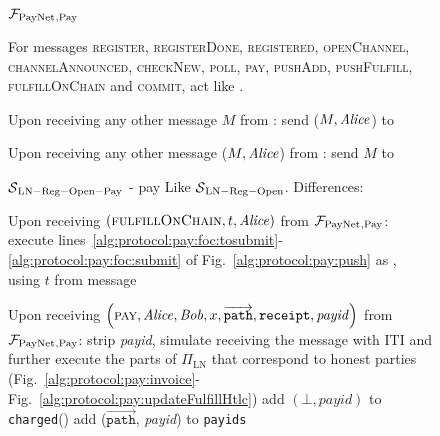 \begin{figure}[H]
  \begin{systembox}{$\mathcal{F}_{\mathrm{PayNet}}{}_{\mathrm{, Pay}}$}
    \begin{algorithmic}[1]
      \State For messages \textsc{register}, \textsc{registerDone},
      \textsc{registered}, \textsc{openChannel}, \textsc{channelAnnounced},
      \textsc{checkNew}, \textsc{poll}, \textsc{pay}, \textsc{pushAdd},
      \textsc{pushFulfill}, \textsc{fulfillOnChain} and \textsc{commit}, act
      like \fpaynet{}.
      \Statex

      \State Upon receiving any other message $M$ from \alice:
      \Indent
          \State send ($M, \mathit{Alice}$) to \simulator
        \EndIf
      \EndIndent
      \Statex

      \State Upon receiving any other message ($M, \mathit{Alice}$) from \simulator:
      \Indent
          \State send $M$ to \alice
        \EndIf
      \EndIndent
    \end{algorithmic}
  \end{systembox}
  \caption{}
  \label{alg:proof:fpaynet:pay}
\end{figure}

\begin{figure}[H]
  \begin{simulatorbox}{$\mathcal{S}{}_{\mathrm{LN - Reg - Open - Pay}}$ - pay}
    Like $\mathcal{S}{}_{\mathrm{LN - Reg - Open}}$. Differences:
    \begin{algorithmic}[1]
      \State Upon receiving $\left(\textsc{fulfillOnChain}, t, \mathit{Alice}\right)$
      from $\mathcal{F}_{\mathrm{PayNet}}{}_{\mathrm{, Pay}}$:
      \Indent
        \State execute
        lines~\ref{alg:protocol:pay:foc:tosubmit}-\ref{alg:protocol:pay:foc:submit}
        of Fig.~\ref{alg:protocol:pay:push} as \alice{}, using $t$ from message
      \EndIndent
      \Statex

      \State Upon receiving $\left(\textsc{pay}, \mathit{Alice}, \mathit{Bob}, x,
      \overrightarrow{\mathtt{path}}, \mathtt{receipt}, \mathit{payid}\right)$
      from $\mathcal{F}_{\mathrm{PayNet}}{}_{\mathrm{, Pay}}$:
      \Indent
        \State strip \textit{payid}, simulate receiving the message with
        \alice{} ITI and further execute the parts of $\Pi_{\mathrm{LN}}$ that
        correspond to honest parties (Fig.~\ref{alg:protocol:pay:invoice}-
        Fig.~\ref{alg:protocol:pay:updateFulfillHtlc})
         
          \State add $\left(\bot, \mathit{payid}\right)$ to
          \texttt{charged}(\alice)
        \Else
          \State add ($\overrightarrow{\mathtt{path}}$, \textit{payid}) to
          \texttt{payids}
        \EndIf
      \EndIndent
    \end{algorithmic}
  \end{simulatorbox}
  \caption{}
  \label{alg:sim:pay}
\end{figure}

